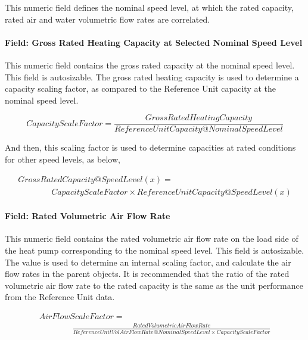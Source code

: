 This numeric field defines the nominal speed level, at which the rated capacity, rated air and water volumetric flow rates are correlated.

\paragraph{Field: Gross Rated Heating Capacity at Selected Nominal Speed Level}\label{field-gross-rated-heating-capacity-at-selected-nominal-speed-level-1}

This numeric field contains the gross rated capacity at the nominal speed level. This field is autosizable. The gross rated heating capacity is used to determine a capacity scaling factor, as compared to the Reference Unit capacity at the nominal speed level.

\begin{equation}
CapacityScaleFactor = \frac{{GrossRatedHeatingCapacity}}{{ReferenceUnitCapacity@NominalSpeedLevel}}
\end{equation}

And then, this scaling factor is used to determine capacities at rated conditions for other speed levels, as below,

\begin{equation}
  \begin{array}{l}
    GrossRatedCapacity@SpeedLevel \left( x \right) = \\
    \quad \quad \quad \quad CapacityScaleFactor \times ReferenceUnitCapacity@SpeedLevel(x)
  \end{array}
\end{equation}

\paragraph{Field: Rated Volumetric Air Flow Rate}\label{field-rated-volumetric-air-flow-rate-2}

This numeric field contains the rated volumetric air flow rate on the load side of the heat pump corresponding to the nominal speed level. This field is autosizable. The value is used to determine an internal scaling factor, and calculate the air flow rates in the parent objects. It is recommended that the ratio of the rated volumetric air flow rate to the rated capacity is the same as the unit performance from the Reference Unit data.

\begin{equation}
  \begin{array}{l}
    AirFlowScaleFactor = \\
    \quad \quad \quad \quad \frac{{RatedVolumetricAirFlowRate}}{{ReferenceUnitVolAirFlowRate@NominalSpeedLevel \times CapacityScaleFactor}}
  \end{array}
\end{equation}

